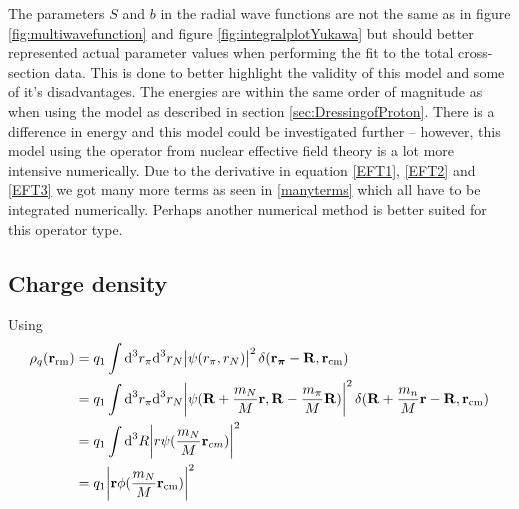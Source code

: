 The parameters $S$ and $b$ in the radial wave functions are not the same as in figure \ref{fig:multiwavefunction} and figure \ref{fig:integralplotYukawa} but should better represented actual parameter values when performing the fit to the total cross-section data. This is done to better highlight the validity of this model and some of it's disadvantages. The energies are within the same order of magnitude as when using the model as described in section \ref{sec:DressingofProton}. There is a difference in energy and this model could be investigated further -- however, this model using the operator from nuclear effective field theory is a lot more intensive numerically. Due to the derivative in equation \eqref{EFT1}, \eqref{EFT2} and \eqref{EFT3} we got many more terms as seen in \eqref{manyterms} which all have to be integrated numerically. Perhaps another numerical method is better suited for this operator type.
\subsection{Charge density}
Using 
\begin{align}
\rho_q(\bm{\mathrm{r}}_\text{rm}) &= q_1 \int \text{d}^3 r_\pi \text{d}^3 r_N \abs{\psi(r_\pi,r_N)}^2 \delta(\bm{\mathrm{r_\pi}}-\bm{\mathrm{R}},\bm{\mathrm{r}}_\text{cm}) \\
&= q_1 \int \text{d}^3 r_\pi \text{d}^3 r_N \abs{\psi(\bm{\mathrm{R}}+\frac{m_N}{M}\bm{\mathrm{r}},\bm{\mathrm{R}}-\frac{m_\pi}{M}\bm{\mathrm{R}})}^2 \delta(\bm{\mathrm{R}}+\frac{m_n}{M}\bm{\mathrm{r}}-\bm{\mathrm{R}},\bm{\mathrm{r}}_\text{cm}) \\
&= q_1 \int \text{d}^3 R \abs{r\psi(\frac{m_N}{M}\bm{\mathrm{r}}_{cm})}^2 \\
&= q_1 \abs{\bm{\mathrm{r}}\phi(\frac{m_N}{M}\bm{\mathrm{r}}_\text{cm})}^2
\end{align}